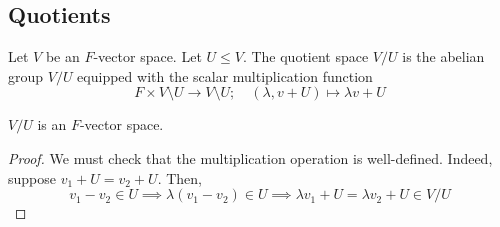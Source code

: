 \subsection{Quotients}
\begin{definition}
Let \( V \) be an \( F \)-vector space.
Let \( U \leq V \).
The quotient space \( V / U \) is the abelian group \( V / U \) equipped with the scalar multiplication function
\[ F \times V \setminus U \to V \setminus U;\quad (\lambda, v + U) \mapsto \lambda v + U \]
\end{definition}
\begin{proposition}
\( V / U \) is an \( F \)-vector space.
\end{proposition}
\begin{proof}
We must check that the multiplication operation is well-defined.
Indeed, suppose \( v_1 + U = v_2 + U \).
Then,
\[ v_1 - v_2 \in U \implies \lambda (v_1 - v_2) \in U \implies \lambda v_1 + U = \lambda v_2 + U \in V / U \]
\end{proof}
